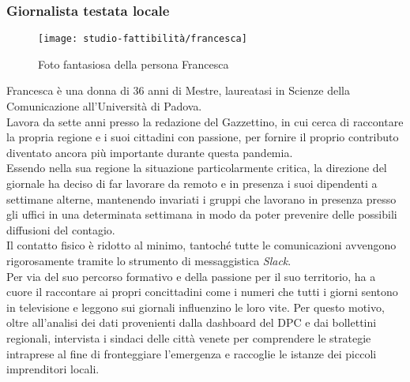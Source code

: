 \subsubsection{Giornalista testata locale}
\label{sss:giornalista-testata-locale}
\begin{wrapfigure}{l}{0.4\textwidth}
	\centering
	\vspace{-13pt}
    \texttt{[image: studio-fattibilità/francesca]}
    \caption{Foto fantasiosa della persona Francesca}
\end{wrapfigure}
Francesca è una donna di 36 anni di Mestre, laureatasi in Scienze della Comunicazione all'Università di Padova.\\ 
Lavora da sette anni presso la redazione del Gazzettino, in cui cerca di raccontare la propria regione e i suoi cittadini con passione, per fornire il proprio contributo diventato ancora più importante durante questa pandemia.\\ 
Essendo nella sua regione la situazione particolarmente critica, la direzione del giornale ha deciso di far lavorare da remoto e in presenza i suoi dipendenti a settimane alterne, mantenendo invariati i gruppi che lavorano in presenza presso gli uffici in una determinata settimana in modo da poter prevenire delle possibili diffusioni del contagio.\\Il contatto fisico è ridotto al minimo, tantoché tutte le comunicazioni avvengono rigorosamente tramite lo strumento di messaggistica \textit{Slack}.\\ 
Per via del suo percorso formativo e della passione per il suo territorio, ha a cuore il raccontare ai propri concittadini come i numeri che tutti i giorni sentono in televisione e leggono sui giornali influenzino le loro vite. Per questo motivo, oltre all'analisi dei dati provenienti dalla dashboard del DPC e dai bollettini regionali, intervista i sindaci delle città venete per comprendere le strategie intraprese al fine di fronteggiare l'emergenza e raccoglie le istanze dei piccoli imprenditori locali.
